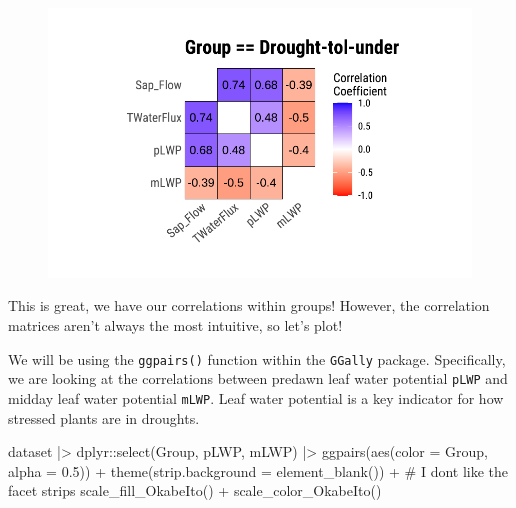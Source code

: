 \documentclass[
  letterpaper,
  DIV=11,
  numbers=noendperiod]{scrreprt}
\newenvironment{Shaded}{\begin{snugshade}}{\end{snugshade}}
\newcommand{\AttributeTok}[1]{\textcolor[rgb]{0.40,0.45,0.13}{#1}}
\newcommand{\CommentTok}[1]{\textcolor[rgb]{0.37,0.37,0.37}{#1}}
\newcommand{\FloatTok}[1]{\textcolor[rgb]{0.68,0.00,0.00}{#1}}
\newcommand{\FunctionTok}[1]{\textcolor[rgb]{0.28,0.35,0.67}{#1}}
\newcommand{\NormalTok}[1]{\textcolor[rgb]{0.00,0.23,0.31}{#1}}
\newcommand{\SpecialCharTok}[1]{\textcolor[rgb]{0.37,0.37,0.37}{#1}}
\begin{document}
\begin{figure}[H]

{\centering \includegraphics{./CorrelateLikeDataMaster_files/figure-pdf/unnamed-chunk-5-4.pdf}

}

\end{figure}

This is great, we have our correlations within groups! However, the
correlation matrices aren't always the most intuitive, so let's plot!

We will be using the \texttt{ggpairs()} function within the
\texttt{GGally} package. Specifically, we are looking at the
correlations between predawn leaf water potential \texttt{pLWP} and
midday leaf water potential \texttt{mLWP}. Leaf water potential is a key
indicator for how stressed plants are in droughts.

\begin{Shaded}
\begin{Highlighting}[]
\NormalTok{dataset }\SpecialCharTok{|\textgreater{}} 
\NormalTok{  dplyr}\SpecialCharTok{::}\FunctionTok{select}\NormalTok{(Group, pLWP, mLWP) }\SpecialCharTok{|\textgreater{}}
  \FunctionTok{ggpairs}\NormalTok{(}\FunctionTok{aes}\NormalTok{(}\AttributeTok{color =}\NormalTok{ Group, }\AttributeTok{alpha =} \FloatTok{0.5}\NormalTok{)) }\SpecialCharTok{+}
  \FunctionTok{theme}\NormalTok{(}\AttributeTok{strip.background =} \FunctionTok{element\_blank}\NormalTok{()) }\SpecialCharTok{+} \CommentTok{\# I don\textquotesingle{}t like the facet strips}
  \FunctionTok{scale\_fill\_OkabeIto}\NormalTok{() }\SpecialCharTok{+}
  \FunctionTok{scale\_color\_OkabeIto}\NormalTok{()}
\end{Highlighting}
\end{Shaded}
\end{document}
